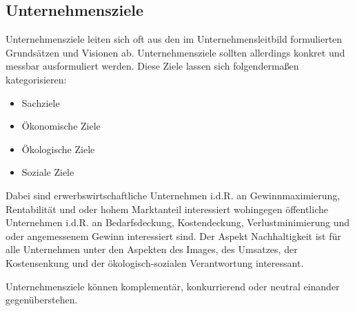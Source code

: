 \subsection{Unternehmensziele}
Unternehmensziele leiten sich oft aus den im Unternehmensleitbild formulierten Grundsätzen und Visionen ab. Unternehmensziele sollten allerdings konkret und messbar ausformuliert werden. Diese Ziele lassen sich folgendermaßen kategorisieren:

\begin{itemize}
    \item Sachziele
    \item Ökonomische Ziele
    \item Ökologische Ziele
    \item Soziale Ziele
\end{itemize}

Dabei sind erwerbswirtschaftliche Unternehmen i.d.R. an Gewinnmaximierung, Rentabilität und oder hohem Marktanteil interessiert wohingegen öffentliche Unternehmen i.d.R. an Bedarfsdeckung, Kostendeckung, Verlustminimierung und oder angemessenem Gewinn interessiert sind. Der Aspekt Nachhaltigkeit ist für alle Unternehmen unter den Aspekten des Images, des Umsatzes, der Kostensenkung und der ökologisch-sozialen Verantwortung interessant.

Unternehmensziele können komplementär, konkurrierend oder neutral einander gegenüberstehen.